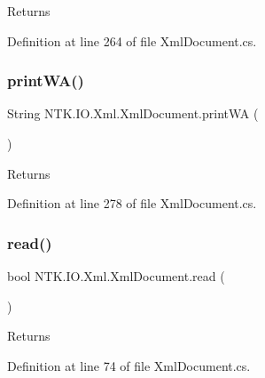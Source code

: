 \begin{DoxyReturn}{Returns}

\end{DoxyReturn}


Definition at line 264 of file Xml\+Document.\+cs.

\mbox{\label{class_n_t_k_1_1_i_o_1_1_xml_1_1_xml_document_ae61f33ee823d20bee7c23f63693c20f6}} 
\subsubsection{\texorpdfstring{printWA()}{printWA()}}
{\footnotesize\ttfamily String N\+T\+K.\+I\+O.\+Xml.\+Xml\+Document.\+print\+WA (\begin{DoxyParamCaption}{ }\end{DoxyParamCaption})}





\begin{DoxyReturn}{Returns}

\end{DoxyReturn}


Definition at line 278 of file Xml\+Document.\+cs.

\mbox{\label{class_n_t_k_1_1_i_o_1_1_xml_1_1_xml_document_a66ae1e70562280d8b212037433f7b2db}} 
\subsubsection{\texorpdfstring{read()}{read()}}
{\footnotesize\ttfamily bool N\+T\+K.\+I\+O.\+Xml.\+Xml\+Document.\+read (\begin{DoxyParamCaption}{ }\end{DoxyParamCaption})}





\begin{DoxyReturn}{Returns}

\end{DoxyReturn}


Definition at line 74 of file Xml\+Document.\+cs.

